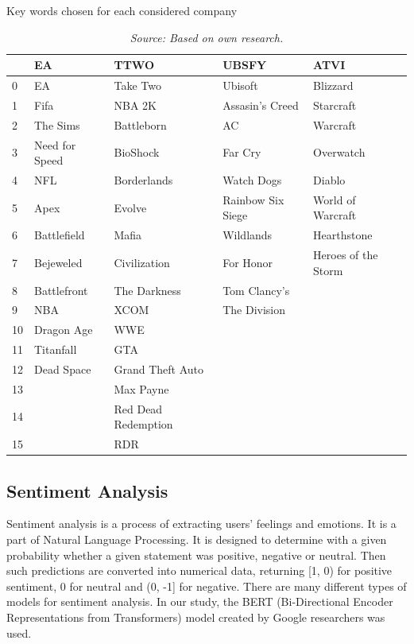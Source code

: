 \documentclass[11pt]{article} %
\begin{document}
\begin{table}[hbt!]
\centering
\caption{Key words chosen for each considered company}
\begin{tabular}{lllll}
\toprule
{} &              EA &                 TTWO &              UBSFY &                 ATVI \\
\midrule
0  &              EA &             Take Two &            Ubisoft &             Blizzard \\
1  &            Fifa &               NBA 2K &    Assasin's Creed &            Starcraft \\
2  &        The Sims &           Battleborn &                 AC &             Warcraft \\
3  &  Need for Speed &             BioShock &            Far Cry &            Overwatch \\
4  &             NFL &          Borderlands &         Watch Dogs &               Diablo \\
5  &            Apex &               Evolve &  Rainbow Six Siege &    World of Warcraft \\
6  &     Battlefield &                Mafia &          Wildlands &          Hearthstone \\
7  &       Bejeweled &         Civilization &          For Honor &  Heroes of the Storm \\
8  &     Battlefront &         The Darkness &       Tom Clancy's &                  \\
9  &             NBA &                 XCOM &       The Division &                  \\
10 &      Dragon Age &                  WWE &                &                  \\
11 &       Titanfall &                  GTA &                &                  \\
12 &      Dead Space &     Grand Theft Auto &                &                  \\
13 &             &            Max Payne &                &                  \\
14 &             &  Red Dead Redemption &                &                  \\
15 &             &                  RDR &                &                  \\
\bottomrule
\end{tabular}
\caption*{\textit{Source: Based on own research.}}
\end{table}


\subsection{Sentiment Analysis}
Sentiment analysis is a process of extracting users' feelings and emotions. It is a part of Natural Language Processing. It is designed to determine with a given probability whether a given statement was positive, negative or neutral. Then such predictions are converted into numerical data, returning [1, 0) for positive sentiment, 0 for neutral and (0, -1] for negative. There are many different types of models for sentiment analysis. In our study, the BERT (Bi-Directional Encoder Representations from Transformers) model created by Google researchers was used. 
\end{document}
